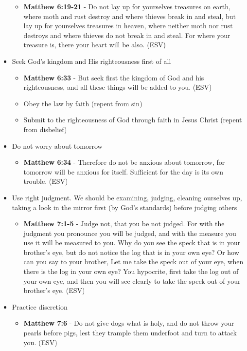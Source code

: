 \documentclass[11pt]{article}
\begin{document}
\begin{itemize}
\begin{itemize}
\item \textbf{Matthew 6:19-21} - Do not lay up for yourselves treasures on earth, where moth and rust destroy and where thieves break in and steal, but lay up for yourselves treasures in heaven, where neither moth nor rust destroys and where thieves do not break in and steal. For where your treasure is, there your heart will be also. (ESV)
\end{itemize}
\item Seek God's kingdom and His righteousness first of all
\begin{itemize}
\item \textbf{Matthew 6:33} - But seek first the kingdom of God and his righteousness, and all these things will be added to you. (ESV)
\item Obey the law by faith (repent from sin)
\item Submit to the righteousness of God through faith in Jesus Christ (repent from disbelief)
\end{itemize}
\item Do not worry about tomorrow
\begin{itemize}
\item \textbf{Matthew 6:34} - Therefore do not be anxious about tomorrow, for tomorrow will be anxious for itself. Sufficient for the day is its own trouble. (ESV)
\end{itemize}
\item Use right judgment. We should be examining, judging, cleaning ourselves up, taking a look in the mirror first (by God's standards) before judging others
\begin{itemize}
\item \textbf{Matthew 7:1-5} - Judge not, that you be not judged. For with the judgment you pronounce you will be judged, and with the measure you use it will be measured to you. Why do you see the speck that is in your brother's eye, but do not notice the log that is in your own eye? Or how can you say to your brother, Let me take the speck out of your eye, when there is the log in your own eye? You hypocrite, first take the log out of your own eye, and then you will see clearly to take the speck out of your brother's eye. (ESV)
\end{itemize}
\item Practice discretion
\begin{itemize}
\item \textbf{Matthew 7:6} - Do not give dogs what is holy, and do not throw your pearls before pigs, lest they trample them underfoot and turn to attack you. (ESV)

\end{itemize}
\end{itemize}
\end{document}
